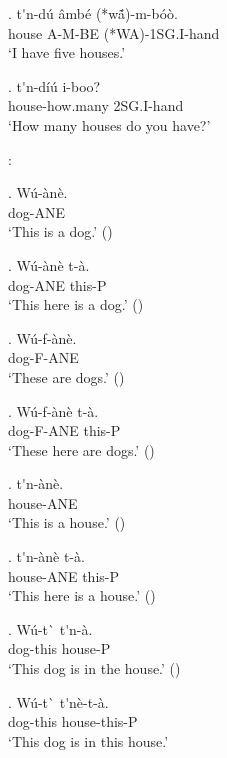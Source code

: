 \documentclass{assets/fieldnotes}
\begin{document}
\exg. t\'{}n-d\'{u} \^{a}mb\'{e} (*wã́)-m-b\'{o}\`{o}. \\
house A-M-BE (*WA)-1SG.I-hand \\
`I have five houses.' 


\exg. t\'{}n-d\'{i}\'{u} i-boo? \\
house-how.many 2SG.I-hand \\
`How many houses do you have?'

:

\exg. W\'{u}-\`{a}n\`{e}. \\
dog-ANE \\
`This is a dog.' ()

\exg. W\'{u}-\`{a}n\`{e} t-\`{a}. \\
dog-ANE this-P \\
`This here is a dog.' ()

\exg. W\'{u}-f-\`{a}n\`{e}. \\
dog-F-ANE \\
`These are dogs.' ()

\exg. W\'{u}-f-\`{a}n\`{e} t-\`{a}. \\
dog-F-ANE this-P \\
`These here are dogs.' ()

\exg. t\'{}n-\`{a}n\`{e}. \\
house-ANE \\
`This is a house.' ()

\exg. t\'{}n-\`{a}n\`{e} t-\`{a}. \\
house-ANE this-P\\
`This here is a house.' ()

\exg. W\'{u}-t\`{} t\'{}n-\`{a}. \\
dog-this house-P \\
`This dog is in the house.' ()

\exg. W\'{u}-t\`{} t\'{}n\`{e}-t-\`{a}. \\
dog-this house-this-P \\
`This dog is in this house.' 
\end{document}
